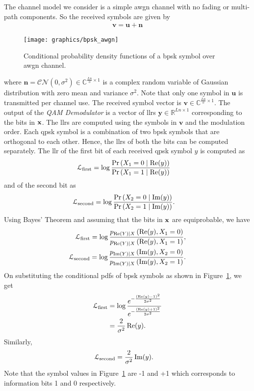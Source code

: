 The channel model we consider is a simple \ac{awgn} channel with no fading or multi-path components. So the received symbols are given by \begin{align}\mathbf{v}=\mathbf{u}+\mathbf{n}\end{align}
\begin{figure}[htbp]
  \centering
  \texttt{[image: graphics/bpsk\_awgn]}
  \caption{Conditional probability density functions of a \ac{bpsk} symbol over \ac{awgn} channel.}
  \label{fig:bpsk_awgn}
\end{figure}
where $\mathbf{n}=\mathcal{CN}(0,\sigma^2)\in\mathbb{C}^{\frac{Ln}{o}\times 1}$ is a complex random variable of Gaussian distribution with zero mean and variance $\sigma^2$. Note that only one symbol in $\mathbf{u}$ is transmitted per channel use. The received symbol vector is $\mathbf{v}\in\mathbb{C}^{\frac{Ln}{o}\times 1}$. The output of the \emph{QAM Demodulator} is a vector of \acp{llr} $\mathbf{y}\in\mathbb{R}^{Ln\times 1}$ corresponding to the bits in $\mathbf{x}$. The \acp{llr} are computed using the symbols in $\mathbf{v}$ and the modulation order. Each \ac{qpsk} symbol is a combination of two \ac{bpsk} symbols that are orthogonal to each other. Hence, the \acp{llr} of both the bits can be computed separately. The \ac{llr} of the first bit of each received \ac{qpsk} symbol $y$ is computed as
\begin{align}
\mathcal{L}_{\text{first}}&=\log\frac{\text{Pr}\left(X_1=0\mid\operatorname{Re}(y)\right)}{\text{Pr}\left(X_1=1\mid\operatorname{Re}(y)\right)}
\end{align}
and of the second bit as
\begin{align}
\mathcal{L}_{\text{second}}&=\log\frac{\text{Pr}\left(X_2=0\mid\operatorname{Im}(y)\right)}{\text{Pr}\left(X_2=1\mid\operatorname{Im}(y)\right)}.
\end{align}
Using Bayes' Theorem and assuming that the bits in $\mathbf{x}$ are equiprobable, we have
\begin{align}
\mathcal{L}_{\text{first}}=\log\frac{p_{\operatorname{Re}(Y)\mid X}\left(\operatorname{Re}(y), X_1=0\right)}{p_{\operatorname{Re}(Y)\mid X}\left(\operatorname{Re}(y), X_1=1\right)},\\
\mathcal{L}_{\text{second}}=\log\frac{p_{\operatorname{Im}(Y)\mid X}\left(\operatorname{Im}(y), X_2=0\right)}{p_{\operatorname{Im}(Y)\mid X}\left(\operatorname{Im}(y), X_2=1\right)}.
\end{align}
On substituting the conditional \acp{pdf} of \ac{bpsk} symbols as shown in Figure~\ref{fig:bpsk_awgn}, we get
\begin{align}
\mathcal{L}_{\text{first}}&=\log\frac{e^{-\frac{(\operatorname{Re}(y)-1)^2}{2\sigma^2}}}{e^{-\frac{(\operatorname{Re}(y)+1)^2}{2\sigma^2}}}\\
&=\frac{2}{\sigma^2}\operatorname{Re}(y)\label{eq:final_llr1}.
\end{align}
Similarly,
\begin{align}
\mathcal{L}_{\text{second}}&=\frac{2}{\sigma^2}\operatorname{Im}(y)\label{eq:final_llr2}.
\end{align}
Note that the symbol values in Figure~\ref{fig:bpsk_awgn} are -1 and +1 which corresponds to information bits 1 and 0 respectively.

